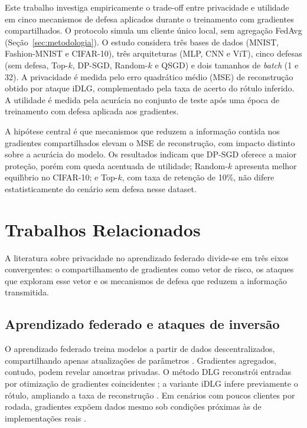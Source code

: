\documentclass[kdmile,a4paper]{kdmile}
\begin{document}
Este trabalho investiga empiricamente o trade-off entre privacidade e utilidade em cinco mecanismos de defesa aplicados durante o treinamento com gradientes compartilhados. O protocolo simula um cliente \'{u}nico local, sem agrega\c{c}\~{a}o FedAvg (Se\c{c}\~{a}o~\ref{sec:metodologia}). O estudo considera tr\^{e}s bases de dados (MNIST, Fashion-MNIST e CIFAR-10), tr\^{e}s arquiteturas (MLP, CNN e ViT), cinco defesas (sem defesa, Top-$k$, DP-SGD, Random-$k$ e QSGD) e dois tamanhos de \textit{batch} (1 e 32). A privacidade \'{e} medida pelo erro quadr\'{a}tico m\'{e}dio (MSE) de reconstru\c{c}\~{a}o obtido por ataque iDLG, complementado pela taxa de acerto do r\'{o}tulo inferido. A utilidade \'{e} medida pela acur\'{a}cia no conjunto de teste ap\'{o}s uma \'{e}poca de treinamento com defesa aplicada aos gradientes.

A hip\'{o}tese central \'{e} que mecanismos que reduzem a informa\c{c}\~{a}o contida nos gradientes compartilhados elevam o MSE de reconstru\c{c}\~{a}o, com impacto distinto sobre a acur\'{a}cia do modelo. Os resultados indicam que DP-SGD oferece a maior prote\c{c}\~{a}o, por\'{e}m com queda acentuada de utilidade; Random-$k$ apresenta melhor equil\'{\i}brio no CIFAR-10; e Top-$k$, com taxa de reten\c{c}\~{a}o de 10\%, n\~{a}o difere estatisticamente do cen\'{a}rio sem defesa nesse dataset.

\section{Trabalhos Relacionados}
\label{sec:relacionados}

A literatura sobre privacidade no aprendizado federado divide-se em tr\^{e}s eixos convergentes: o compartilhamento de gradientes como vetor de risco, os ataques que exploram esse vetor e os mecanismos de defesa que reduzem a informa\c{c}\~{a}o transmitida.

\subsection{Aprendizado federado e ataques de invers\~{a}o}

O aprendizado federado treina modelos a partir de dados descentralizados, compartilhando apenas atualiza\c{c}\~{o}es de par\^{a}metros \cite{McMahan2017}. Gradientes agregados, contudo, podem revelar amostras privadas. O m\'{e}todo DLG reconstr\'{o}i entradas por otimiza\c{c}\~{a}o de gradientes coincidentes \cite{Zhu2019}; a variante iDLG infere previamente o r\'{o}tulo, ampliando a taxa de reconstru\c{c}\~{a}o \cite{Zhao2020}. Em cen\'{a}rios com poucos clientes por rodada, gradientes exp\~{o}em dados mesmo sob condi\c{c}\~{o}es pr\'{o}ximas \`{a}s de implementa\c{c}\~{o}es reais \cite{Geiping2020}.
\end{document}
